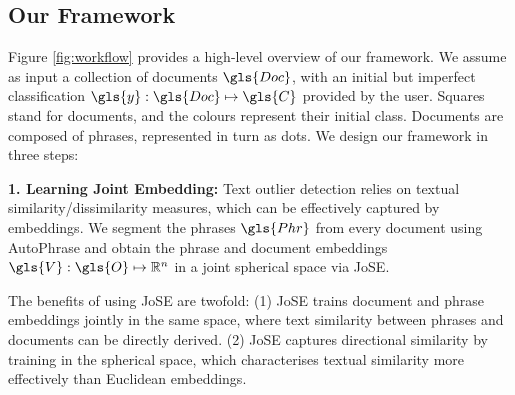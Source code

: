 \subsection{Our Framework}
\label{sec:kjNNframework}

Figure \ref{fig:workflow} provides a high-level overview of our framework. We assume as input a collection of documents $\gls{Doc}$, with an initial but imperfect classification $\gls{y}: \gls{Doc} \mapsto \gls{C}$ provided by the user. Squares stand for documents, and the colours represent their initial class. Documents are composed of phrases, represented in turn as dots. We design our framework in three steps: 

\textbf{1. Learning Joint Embedding:} Text outlier detection relies on textual similarity/dissimilarity measures, which can be effectively captured by %
embeddings. We segment the phrases $\gls{Phr}$ from every document using AutoPhrase \cite{DBLP:journals/tkde/ShangLJRVH18} and obtain the phrase and document embeddings $\gls{V}: \gls{O} \mapsto \mathbb{R}^n$ in a joint spherical space via \gls{JoSE}. 

The benefits of using \gls{JoSE} are %
twofold: (1) \gls{JoSE} trains document %
and phrase embeddings jointly in the same space, where text similarity between phrases and documents can be directly derived. (2) \gls{JoSE} captures directional similarity by training in the spherical space, which characterises textual similarity more effectively than Euclidean embeddings. 

